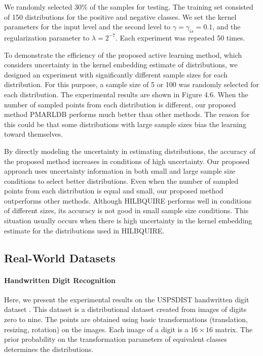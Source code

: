 	We randomly selected 30\% of the samples for testing. The training set consisted of 150 distributions for the positive and negative classes. We set the kernel parameters for the input level and the second level to $\gamma = \gamma_{is} = 0.1$, and the regularization parameter to $\lambda = 2^{-7}$. Each experiment was repeated 50 times.
	
	To demonstrate the efficiency of the proposed active learning method, which considers uncertainty in the kernel embedding estimate of distributions, we designed an experiment with significantly different sample sizes for each distribution. For this purpose, a sample size of 5 or 100 was randomly selected for each distribution. The experimental results are shown in Figure 4.6. When the number of sampled points from each distribution is different, our proposed method PMARLDB performs much better than other methods. The reason for this could be that some distributions with large sample sizes bias the learning toward themselves.
	
	By directly modeling the uncertainty in estimating distributions, the accuracy of the proposed method increases in conditions of high uncertainty. Our proposed approach uses uncertainty information in both small and large sample size conditions to select better distributions. Even when the number of sampled points from each distribution is equal and small, our proposed method outperforms other methods. Although HILBQUIRE performs well in conditions of different sizes, its accuracy is not good in small sample size conditions. This situation usually occurs when there is high uncertainty in the kernel embedding estimate for the distributions used in HILBQUIRE.
	
	\subsection{Real-World Datasets}
	
	\paragraph{Handwritten Digit Recognition}
	Here, we present the experimental results on the USPSDIST handwritten digit dataset \cite{sriperumbudur2009kernel}. This dataset is a distributional dataset created from images of digits zero to nine. The points are obtained using basic transformations (translation, resizing, rotation) on the images. Each image of a digit is a $16 \times 16$ matrix. The prior probability on the transformation parameters of equivalent classes determines the distributions.
	

